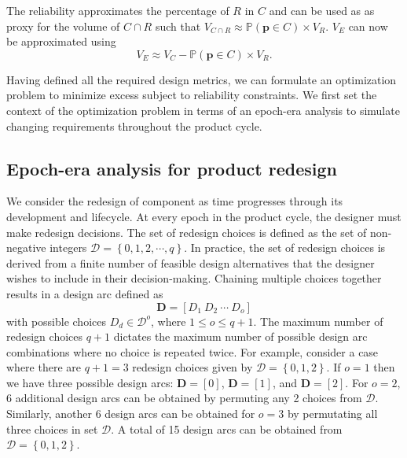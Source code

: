 The reliability approximates the percentage of $R$ in $C$ and can be used as as proxy for the volume of $C\cap R$ such that $V_{C\cap R} \approx \mathbb{P}(\mathbf{p} \in C) \times V_R$. $V_E$ can now be approximated using
%
\begin{equation} \label{eq:excesssimple}
	V_E \approx V_C - \mathbb{P}(\mathbf{p} \in C) \times V_R.
\end{equation}

Having defined all the required design metrics, we can formulate an optimization problem to minimize excess subject to reliability constraints. We first set the context of the optimization problem in terms of an epoch-era analysis \cite{Ross2008} to simulate changing requirements throughout the product cycle.

\subsection{Epoch-era analysis for product redesign} \label{subsec:epochera}

We consider the redesign of component as time progresses through its development and lifecycle. At every epoch in the product cycle, the designer must make redesign decisions. The set of redesign choices is defined as the set of non-negative integers $\mathcal{D} = \left\{0,1,2,\cdots,q\right\}$. In practice, the set of redesign choices is derived from a finite number of feasible design alternatives that the designer wishes to include in their decision-making. Chaining multiple choices together results in a design arc defined as
%
\begin{equation} \label{eq:designarc}
	\mathbf{D} = \left[D_1 ~ D_2 ~ \cdots ~ D_o\right]%
\end{equation}
%
with possible choices $D_d \in \mathcal{D}^o$, where $1 \leq o \leq q+1$. The maximum number of redesign choices $q + 1$ dictates the maximum number of possible design arc combinations where no choice is repeated twice. For example, consider a case where there are $q + 1 = 3$ redesign choices given by $\mathcal{D} = \left\{0,1,2\right\}$. If $o=1$ then we have three possible design arcs: $\mathbf{D} = \left[0\right]$, $\mathbf{D} = \left[1\right]$, and $\mathbf{D} = \left[2\right]$. For $o=2$, 6 additional design arcs can be obtained by permuting any 2 choices from $\mathcal{D}$. Similarly, another 6 design arcs can be obtained for $o=3$ by permutating all three choices in set $\mathcal{D}$. A total of 15 design arcs can be obtained from $\mathcal{D} = \left\{0,1,2\right\}$.

